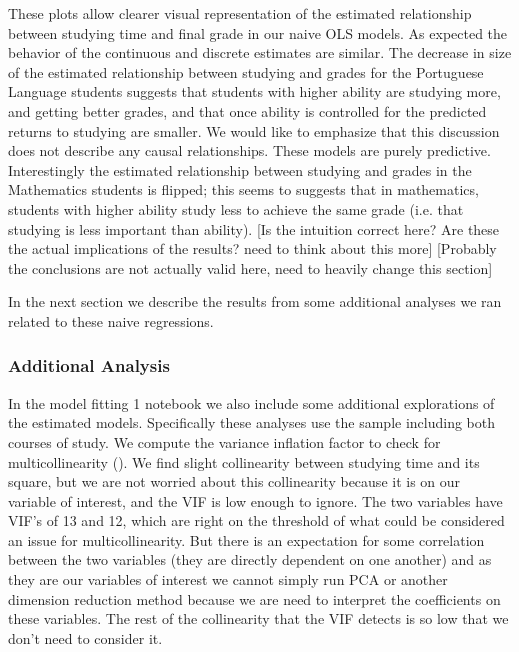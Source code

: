 \documentclass[12pt]{article}
\begin{document}
These plots allow clearer visual representation of the estimated relationship between studying time and final grade in our naive OLS models. As expected the behavior of the continuous and discrete estimates are similar. The decrease in size of the estimated relationship between studying and grades for the Portuguese Language students suggests that students with higher ability are studying more, and getting better grades, and that once ability is controlled for the predicted returns to studying are smaller. We would like to emphasize that this discussion does not describe any causal relationships. These models are purely predictive. Interestingly the estimated relationship between studying and grades in the Mathematics students is flipped; this seems to suggests that in mathematics, students with higher ability study less to achieve the same grade (i.e. that studying is less important than ability). \textcolor{BrickRed}{[Is the intuition correct here? Are these the actual implications of the results? need to think about this more]} \textcolor{BlueGreen}{[Probably the conclusions are not actually valid here, need to heavily change this section]}

In the next section we describe the results from some additional analyses we ran related to these naive regressions.

\subsubsection{Additional Analysis}
In the model fitting 1 notebook we also include some additional explorations of the estimated models. Specifically these analyses use the sample including both courses of study. We compute the variance inflation factor to check for multicollinearity (\cite{VIF, detecting}). We find slight collinearity between studying time and its square, but we are not worried about this collinearity because it is on our variable of interest, and the VIF is low enough to ignore. \textcolor{BlueGreen}{The two variables have VIF's of 13 and 12, which are right on the threshold of what could be considered an issue for multicollinearity. But there is an expectation for some correlation between the two variables (they are directly dependent on one another) and as they are our variables of interest we cannot simply run PCA or another dimension reduction method because we are need to interpret the coefficients on these variables.} The rest of the collinearity that the VIF detects is so low that we don't need to consider it.
\end{document}
